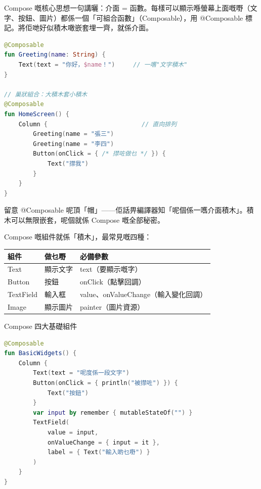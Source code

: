 


Compose 嘅核心思想一句講曬：介面 = 函數。每樣可以顯示喺螢幕上面嘅嘢（文字、按鈕、圖片）都係一個「可組合函數」（Composable），用 @Composable 標記。將佢哋好似積木噉嵌套埋一齊，就係介面。

\begin{lstlisting}[language=Kotlin]
@Composable
fun Greeting(name: String) {
    Text(text = "你好，$name！")     // 一嚿"文字積木"
}

// 巢狀組合：大積木套小積木
@Composable
fun HomeScreen() {
    Column {                          // 直向排列
        Greeting(name = "張三")
        Greeting(name = "李四")
        Button(onClick = { /* 㩒咗做乜 */ }) {
            Text("㩒我")
        }
    }
}
\end{lstlisting}

留意 @Composable 呢頂「帽」——佢話畀編譯器知「呢個係一嚿介面積木」。積木可以無限嵌套，呢個就係 Compose 嘅全部秘密。


Compose 嘅組件就係「積木」，最常見嘅四種：

\begin{center}
\begin{tabularx}{\linewidth}{|X|X|X|}
\hline
\textbf{組件} & \textbf{做乜嘢} & \textbf{必備參數} \tabularnewline
\hline
Text & 顯示文字 & text（要顯示嘅字） \tabularnewline
Button & 按鈕 & onClick（點擊回調） \tabularnewline
TextField & 輸入框 & value、onValueChange（輸入變化回調） \tabularnewline
Image & 顯示圖片 & painter（圖片資源） \tabularnewline
\hline
\end{tabularx}
\end{center}

\begin{center}\small\color{gray}Compose 四大基礎組件\end{center}

\begin{lstlisting}[language=Kotlin]
@Composable
fun BasicWidgets() {
    Column {
        Text(text = "呢度係一段文字")
        Button(onClick = { println("被㩒咗") }) {
            Text("按鈕")
        }
        var input by remember { mutableStateOf("") }
        TextField(
            value = input,
            onValueChange = { input = it },
            label = { Text("輸入啲乜嘢") }
        )
    }
}
\end{lstlisting}

